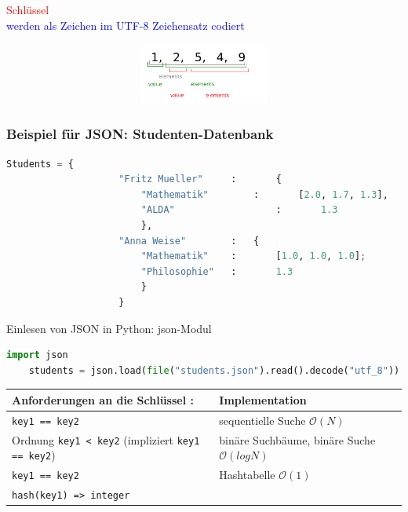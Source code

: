 \documentclass[11pt, fleqn]{scrreprt}
\begin{document}
\textcolor{red}{Schlüssel} \\
\textcolor{blue}{werden als Zeichen im UTF-8 Zeichensatz codiert}

\includegraphics[width=16cm,height=2cm,keepaspectratio]{./Pictures/komischesArray.png}

\subsubsection*{Beispiel für JSON: Studenten-Datenbank}
\begin{lstlisting}[language=Python]
Students = {
					"Fritz Mueller" 	:		{
						"Mathematik"		:		[2.0, 1.7, 1.3],
						"ALDA"					:		1.3
						},
					"Anna Weise"		: 	{
						"Mathematik"	:		[1.0, 1.0, 1.0];
						"Philosophie"	:		1.3
						}
					}
\end{lstlisting}
Einlesen von JSON in Python: json-Modul

\begin{lstlisting}[language=Python]
	import json
	students = json.load(file("students.json").read().decode("utf_8"))
\end{lstlisting}

\vspace*{1cm}

\begin{tabular}{L{8.5cm} | L{7cm}}
	\textbf{Anforderungen an die Schlüssel :} & Implementation \\ \hline
	\verb|key1 == key2| & sequentielle Suche $\mathcal{O}(N)$ \\ \hline
	Ordnung \verb|key1 < key2| (impliziert \verb|key1 == key2|) & binäre Suchbäume, binäre Suche $\mathcal{O}(log N)$ \\ \hline
	\verb|key1 == key2| & Hashtabelle \hspace*{2cm} $\mathcal{O}(1)$ \\
	\verb|hash(key1) => integer| & \\
\end{tabular}

\vspace*{1cm}
\end{document}
